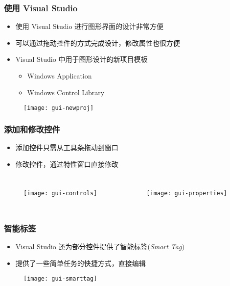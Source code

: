 \begin{frame}
\frametitle{使用 Visual Studio}
\begin{itemize}
\item 使用 Visual Studio 进行图形界面的设计非常方便
\item 可以通过拖动控件的方式完成设计，修改属性也很方便
\item Visual Studio 中用于图形设计的新项目模板
\begin{itemize}
\item Windows Application
\item Windows Control Library
\end{itemize}
\end{itemize}
\begin{figure}[htbp]
  \centering
  \texttt{[image: gui-newproj]}
\end{figure}
\end{frame}

\begin{frame}
\frametitle{添加和修改控件}
\begin{itemize}
\item 添加控件只需从工具条拖动到窗口
\item 修改控件，通过特性窗口直接修改
\end{itemize}
\begin{columns}
  \begin{figure}[htbp]
    \centering
    \texttt{[image: gui-controls]}
  \end{figure}
  \begin{figure}[htbp]
    \centering
    \texttt{[image: gui-properties]}
  \end{figure}
\end{columns}
\end{frame}

\begin{frame}
\frametitle{智能标签}
\begin{itemize}
\item Visual Studio 还为部分控件提供了智能标签(\textit{Smart Tag})
\item 提供了一些简单任务的快捷方式，直接编辑
\end{itemize}
\begin{figure}[htbp]
  \centering
  \texttt{[image: gui-smarttag]}
\end{figure}
\end{frame}


